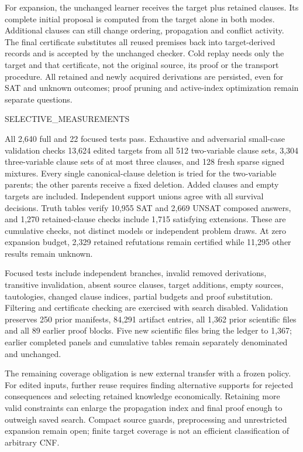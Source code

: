 For expansion, the unchanged learner receives the target plus retained clauses.
Its complete initial proposal is computed from the target alone in both modes.
Additional clauses can still change ordering, propagation and conflict activity.
The final certificate substitutes all reused premises back into target-derived
records and is accepted by the unchanged checker.  Cold replay needs only the
target and that certificate, not the original source, its proof or the transport
procedure.  All retained and newly acquired derivations are persisted, even for
SAT and unknown outcomes; proof pruning and active-index optimization remain
separate questions.

SELECTIVE_MEASUREMENTS

All 2,640 full and 22 focused tests pass.  Exhaustive and adversarial small-case
validation checks 13,624 edited targets from all 512 two-variable clause sets,
3,304 three-variable clause sets of at most three clauses, and 128 fresh sparse
signed mixtures.  Every single canonical-clause deletion is tried for the
two-variable parents; the other parents receive a fixed deletion.  Added
clauses and empty targets are included.  Independent support unions agree with
all survival decisions.  Truth tables verify 10,955 SAT and 2,669 UNSAT composed
answers, and 1,270 retained-clause checks include 1,715 satisfying extensions.
These are cumulative checks, not distinct models or independent problem draws.
At zero expansion budget, 2,329 retained refutations remain certified while
11,295 other results remain unknown.

Focused tests include independent branches, invalid removed derivations,
transitive invalidation, absent source clauses, target additions, empty sources,
tautologies, changed clause indices, partial budgets and proof substitution.
Filtering and certificate checking are exercised with search disabled.
Validation preserves 250 prior manifests, 84,291 artifact entries, all 1,362
prior scientific files and all 89 earlier proof blocks.  Five new scientific
files bring the ledger to 1,367; earlier completed panels and cumulative tables
remain separately denominated and unchanged.

The remaining coverage obligation is new external transfer with a frozen policy.
For edited inputs, further reuse requires finding alternative supports for
rejected consequences and selecting retained knowledge economically.  Retaining
more valid constraints can enlarge the propagation index and final proof enough
to outweigh saved search.  Compact source guards, preprocessing and unrestricted
expansion remain open; finite target coverage is not an efficient classification
of arbitrary CNF.
